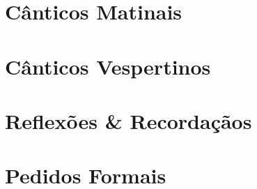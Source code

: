 
\morningPartSettings

\part{Cânticos Matinais}

\morningChapterSettings



\morningSettingsRestore

\eveningPartSettings

\part{Cânticos Vespertinos}

\eveningChapterSettings



\eveningSettingsRestore


\part{Reflexões \& Recordaçãos}





\requestsPartSettings

\part{Pedidos Formais}

\requestsChapterSettings



\requestsSettingsRestore
